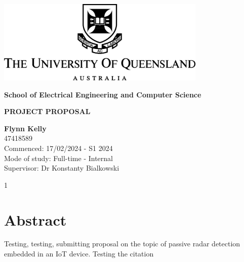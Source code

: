 \documentclass[12pt,a4paper]{article}
\begin{document}
\begin{titlepage}
    \begin{center}
        \vspace*{1cm}

        \includegraphics[width=0.75\textwidth]{UQLogo.jpg}
        
        \vspace{1.5cm}
        
        \textbf{\Large{School of Electrical Engineering and Computer Science}}
        
        \vspace{2.5cm}
        
        \textbf{\Large{PROJECT PROPOSAL}}
        
        \vspace{2cm}
        
        \textbf{Flynn Kelly}\\
        47418589\\
        
        Commenced: 17/02/2024 - S1 2024\\
        Mode of study: Full-time - Internal\\
        Supervisor: Dr Konstanty Bialkowski
        
        \vfill
        
        \vspace{0.8cm}
        
        \Large{1}
        
    \end{center}
\end{titlepage}

\tableofcontents
\clearpage

\section{Abstract}
Testing, testing, submitting proposal on the topic of passive radar detection embedded in an IoT device.
Testing the citation \cite{DTSO2009}
\end{document}
